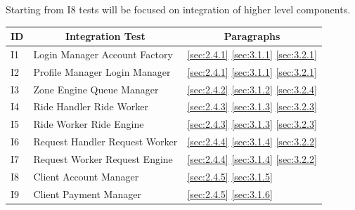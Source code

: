 \documentclass[a4paper,11pt]{report} %
\begin{document}
			Starting from I8 tests will be focused on integration of higher level components.
			\bigskip
			\begin{center}
				\begin{tabular}{ l | p{7cm} | p{5cm} }\hline
					\multicolumn{1}{c|}{\textbf{ID}} & \multicolumn{1}{|c|}{\textbf{Integration Test}} & \multicolumn{1}{|c}{\textbf{Paragraphs}}\\\hline
					 I1 & Login Manager \textrightarrow Account Factory & \ref{sec:2.4.1} \hspace{25pt} \ref{sec:3.1.1} \hspace{25pt} \ref{sec:3.2.1}\\\hline
					 I2 & Profile Manager \textrightarrow Login Manager & \ref{sec:2.4.1} \hspace{25pt} \ref{sec:3.1.1} \hspace{25pt} \ref{sec:3.2.1}\\\hline
					 I3 & Zone Engine \textrightarrow Queue Manager & \ref{sec:2.4.2} \hspace{25pt} \ref{sec:3.1.2} \hspace{25pt} \ref{sec:3.2.4}\\\hline
					 I4 & Ride Handler \textrightarrow Ride Worker & \ref{sec:2.4.3} \hspace{25pt} \ref{sec:3.1.3} \hspace{25pt} \ref{sec:3.2.3}\\\hline
					 I5 & Ride Worker \textrightarrow Ride Engine & \ref{sec:2.4.3} \hspace{25pt} \ref{sec:3.1.3} \hspace{25pt} \ref{sec:3.2.3}\\\hline						 
					 I6 & Request Handler \textrightarrow Request Worker & \ref{sec:2.4.4} \hspace{25pt} \ref{sec:3.1.4} \hspace{25pt} \ref{sec:3.2.2}\\\hline
					 I7 & Request Worker \textrightarrow Request Engine & \ref{sec:2.4.4} \hspace{25pt} \ref{sec:3.1.4} \hspace{25pt} \ref{sec:3.2.2}\\\hline		 					 					 	
					 I8 & Client \textrightarrow Account Manager & \ref{sec:2.4.5} \hspace{25pt} \ref{sec:3.1.5}\\\hline		
					 I9 & Client \textrightarrow Payment Manager & \ref{sec:2.4.5} \hspace{25pt} \ref{sec:3.1.6}\\\hline					 					 					 	

\end{tabular}
\end{center}
\end{document}

